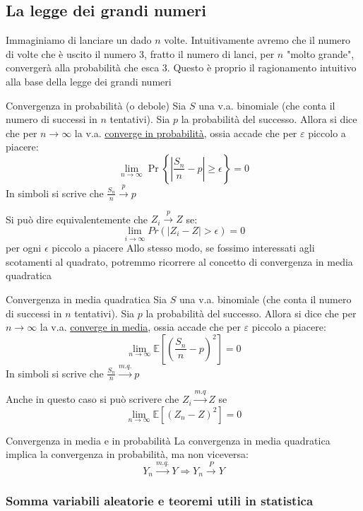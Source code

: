 \subsection{La legge dei grandi numeri}
Immaginiamo di lanciare un dado $ n $ volte. Intuitivamente avremo che il numero di volte che è uscito il numero $ 3 $, fratto il numero di lanci, per $ n $ "molto grande", convergerà alla probabilità che esca $ 3 $. Questo è proprio il ragionamento intuitivo alla base della legge dei grandi numeri
\begin{definizione}{Convergenza in probabilità (o debole)}
	Sia $ S $ una v.a. binomiale (che conta il numero di successi in $ n $ tentativi). Sia $ p $ la probabilità del successo. Allora si dice che per $ n \to  \infty  $ la v.a. \underline{converge in probabilità}, ossia accade che per $ \varepsilon $ piccolo a piacere:
	\[
		\lim_{n \to \infty} \Pr\left\{\left|\frac{S_n}{n} - p\right| \ge \epsilon \right\} = 0
	\]
	In simboli si scrive che $ \frac{S_n}{n} \xrightarrow{p} p   $
\end{definizione}
Si può dire equivalentemente che $ Z_i \xrightarrow{p}Z  $ se:
\[
	\lim_{i \to \infty} Pr\left( \left|Z_i - Z\right| > \epsilon \right) = 0
\]
per ogni $ \epsilon  $ piccolo a piacere
\vskip3mm
Allo stesso modo, se fossimo interessati agli scotamenti al quadrato, potremmo ricorrere al concetto di convergenza in media quadratica
\begin{definizione}{Convergenza in media quadratica}
	Sia $ S $ una v.a. binomiale (che conta il numero di successi in $ n $ tentativi). Sia $ p $ la probabilità del successo. Allora si dice che per $ n \to  \infty  $ la v.a. \underline{converge in media}, ossia accade che per $ \varepsilon $ piccolo a piacere:
	\[
		\lim_{n \to \infty} \mathbb{E}\left[\left(\frac{S_n}{n} - p\right)^2 \right] = 0
	\]
	In simboli si scrive che $ \frac{S_n}{n} \xrightarrow{m.q.} p   $
\end{definizione}
Anche in questo caso si può scrivere che $ Z _i \xrightarrow{m.q} Z $ se
\[
	\lim_{n \to \infty } \mathbb{E} \left[\left(Z_n - Z\right)^2 \right] = 0
\]
\begin{teorema}{Convergenza in media e in probabilità}
	La convergenza in media quadratica implica la convergenza in probabilità, ma non viceversa:
	\[
		Y_n \xrightarrow{m.q.} Y \Rightarrow Y_n \xrightarrow{P} Y
	\]
\end{teorema}
\subsubsection*{Somma variabili aleatorie e teoremi utili in statistica}

